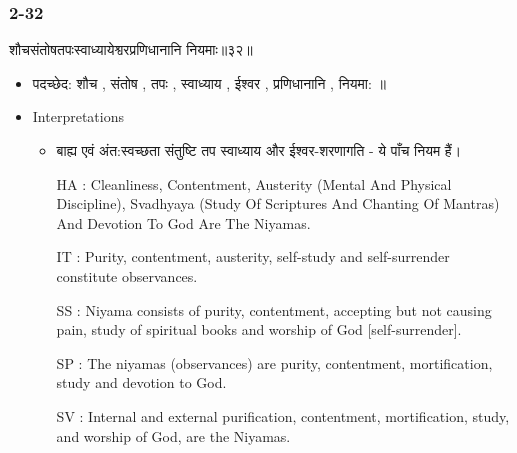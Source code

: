 \begin{frame}[fragile]\frametitle{2-32}
\begin{sanskrit}
शौचसंतोषतपःस्वाध्यायेश्वरप्रणिधानानि नियमाः॥३२॥
\end{sanskrit}

	\begin{itemize}
	\item पदच्छेद: शौच , संतोष , तपः , स्वाध्याय , ईश्वर , प्रणिधानानि , नियमा: ॥
	\item Interpretations
		\begin{itemize}
		\item बाह्य एवं अंत:स्वच्छता संतुष्टि तप स्वाध्याय और ईश्वर-शरणागति - ये पाँच नियम हैं।
		\item [HA]: Cleanliness, Contentment, Austerity (Mental And Physical Discipline), Svadhyaya (Study Of Scriptures And Chanting Of Mantras) And Devotion To God Are The Niyamas.
		\item [IT]: Purity, contentment, austerity, self-study and self-surrender constitute observances.
		\item [SS]: Niyama consists of purity, contentment, accepting but not causing pain, study of spiritual books and worship of God [self-surrender].
		\item [SP]: The niyamas (observances) are purity, contentment, mortification, study and devotion to God.
		\item [SV]: Internal and external purification, contentment, mortification, study, and worship of God, are the Niyamas. 
		\end{itemize}
	\end{itemize}	
\end{frame}


